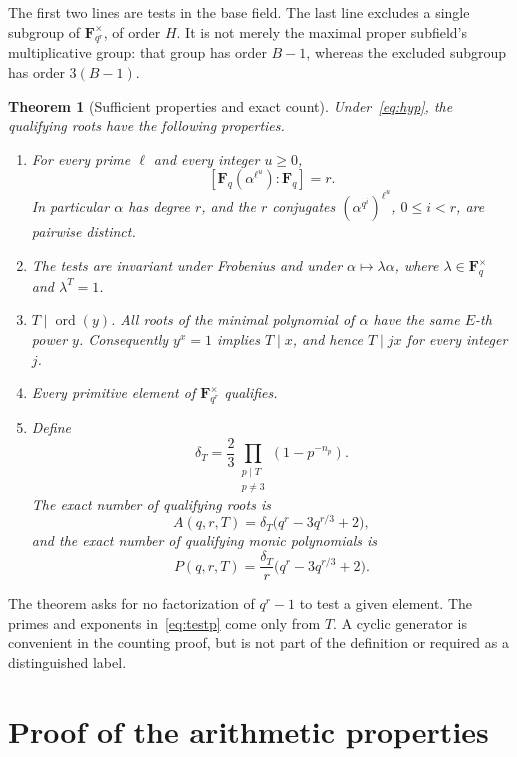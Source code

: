 \documentclass[11pt,a4paper]{article}
\newcommand{\F}{\mathbf F}
\newcommand{\ord}{\operatorname{ord}}
\newtheorem{theorem}{Theorem}[section]
\theoremstyle{definition}
\theoremstyle{remark}
\begin{document}
The first two lines are tests in the base field. The last line excludes a
single subgroup of $\F_{q^r}^{\times}$, of order $H$. It is not merely the
maximal proper subfield's multiplicative group: that group has order
$B-1$, whereas the excluded subgroup has order $3(B-1)$.

\begin{theorem}[Sufficient properties and exact count]
\label{thm:replacement}
Under~\eqref{eq:hyp}, the qualifying roots have the following properties.
\begin{enumerate}[label=\textup{(\roman*)}]
\item For every prime $\ell$ and every integer $u\ge0$,
\[
 [\F_q(\alpha^{\ell^u}):\F_q]=r.
\]
In particular $\alpha$ has degree $r$, and the $r$ conjugates
$(\alpha^{q^i})^{\ell^u}$, $0\le i<r$, are pairwise distinct.
\item The tests are invariant under Frobenius and under
$\alpha\mapsto\lambda\alpha$, where $\lambda\in\F_q^{\times}$ and
$\lambda^T=1$.
\item $T\mid\ord(y)$. All roots of the minimal polynomial of $\alpha$
have the same $E$-th power $y$. Consequently $y^x=1$ implies $T\mid x$,
and hence $T\mid jx$ for every integer $j$.
\item Every primitive element of $\F_{q^r}^{\times}$ qualifies.
\item Define
\begin{equation}
 \delta_T=\frac23\prod_{\substack{p\mid T\\p\ne3}}
                  (1-p^{-n_p}).
 \label{eq:delta}
\end{equation}
The exact number of qualifying roots is
\begin{equation}
 A(q,r,T)=\delta_T\bigl(q^r-3q^{r/3}+2\bigr),
 \label{eq:roots}
\end{equation}
and the exact number of qualifying monic polynomials is
\begin{equation}
 P(q,r,T)=\frac{\delta_T}{r}\bigl(q^r-3q^{r/3}+2\bigr).
 \label{eq:polys}
\end{equation}
\end{enumerate}
\end{theorem}

The theorem asks for no factorization of $q^r-1$ to test a given element.
The primes and exponents in~\eqref{eq:testp} come only from $T$. A cyclic
generator is convenient in the counting proof, but is not part of the
definition or required as a distinguished label.

\section{Proof of the arithmetic properties}
\label{sec:proof}
\end{document}
